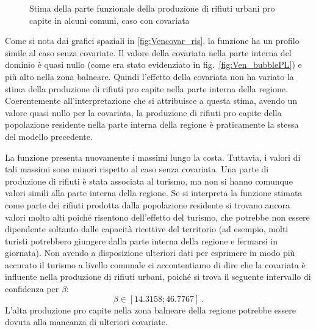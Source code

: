 \documentclass[a4paper,11pt,twoside,openright]{book}							%
\begin{document}
\begin{figure}[t]
{   }
	\caption{Stima della parte funzionale della produzione di rifiuti urbani pro capite in alcuni comuni, caso con covariata}
	\label{fig:Vencovar_tempo}
\end{figure}
\newpage
Come si nota dai grafici spaziali in \ref{fig:Vencovar_ris}, la funzione ha un profilo simile al caso senza covariate. Il valore della covariata nella parte interna del dominio è quasi nullo (come era stato evidenziato in fig.~\ref{fig:Ven_bubblePL}) e più alto nella zona balneare. Quindi l'effetto della covariata non ha variato la stima della produzione di rifiuti pro capite nella parte interna della regione. Coerentemente all'interpretazione che si attribuisce a questa stima, avendo un valore quasi nullo per la covariata, la produzione di rifiuti pro capite della popolazione residente nella parte interna della regione è praticamente la stessa del modello precedente.

La funzione presenta nuovamente i massimi lungo la costa. Tuttavia, i valori di tali massimi sono minori rispetto al caso senza covariata. Una parte di produzione di rifiuti è stata associata al turismo, ma non si hanno comunque valori simili alla parte interna della regione. Se si interpreta la funzione stimata come parte dei rifiuti prodotta dalla popolazione residente si trovano ancora valori molto alti poiché risentono dell'effetto del turismo, che potrebbe non essere dipendente soltanto dalle capacità ricettive del territorio (ad esempio, molti turisti potrebbero giungere dalla parte interna della regione e fermarsi in giornata). Non avendo a disposizione ulteriori dati per esprimere in modo più accurato il turismo a livello comunale ci accontentiamo di dire che la covariata è influente nella produzione di rifiuti urbani, poiché si trova il seguente intervallo di confidenza per $\beta$:
$$
\beta \in [14.3158;46.7767] \ .
$$
L'alta produzione pro capite nella zona balneare della regione potrebbe essere dovuta alla mancanza di ulteriori covariate.
\end{document}
